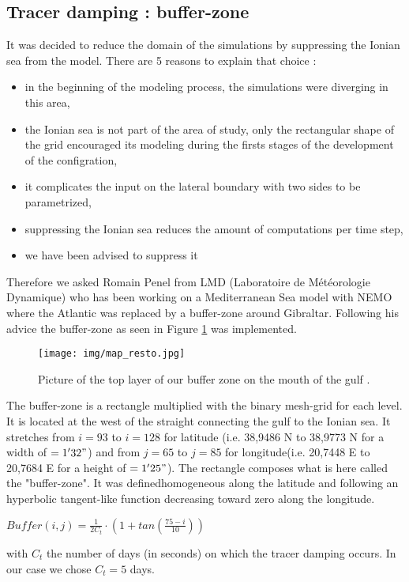 \documentclass[english]{PFeENSTA}
\begin{document}
{\subsection{Tracer damping : buffer-zone}
It was decided to reduce the domain of the simulations by suppressing the Ionian sea from the model. There are 5 reasons to explain that choice : 
\begin{itemize}
\item in the beginning of the modeling process, the simulations were diverging in this area,
\item the Ionian sea is not part of the area of study, only the rectangular shape of the grid encouraged its modeling during the firsts stages of the development of the configration, 
\item it complicates the input on the lateral boundary with two sides to be parametrized, 
\item suppressing the Ionian sea reduces the amount of computations per time step, 
\item we have been advised to suppress it
\end{itemize} 

Therefore we asked Romain Penel from LMD (Laboratoire de Météorologie Dynamique) who has been working on a Mediterranean Sea model with NEMO where the Atlantic was replaced by a buffer-zone around Gibraltar. Following his advice the buffer-zone as seen in Figure \ref{fig:buffer_zone} was implemented.

\begin{figure}[!h]
\centering
\texttt{[image: img/map\_resto.jpg]}
\caption{\label{fig:buffer_zone} Picture of the top layer of our buffer zone on the mouth of the gulf . }
\end{figure}

The buffer-zone is a rectangle multiplied with the binary mesh-grid for each level. It is located at the west of the straight connecting the gulf to the Ionian sea. It stretches from $i=93$ to $i=128$ for latitude (i.e. 38,9486 \degree N to 38,9773 \degree N for a width of $=1'32"$) and from $j=65$ to $j=85$ for longitude(i.e. 20,7448 \degree E to 20,7684 \degree E for a height of $=1'25"$). The rectangle composes what is here called the "buffer-zone". It was definedhomogeneous along the latitude and following an hyperbolic tangent-like function decreasing toward zero along the longitude.

\begin{center}
 $Buffer(i,j)= \frac{1}{2 C_t} \cdot (1+ tan(\frac{75-i}{10})) $
\end{center} 
with $C_t$ the number of days (in seconds) on which the tracer damping occurs. In our case we chose $C_t=5$ days.

}
\end{document}
